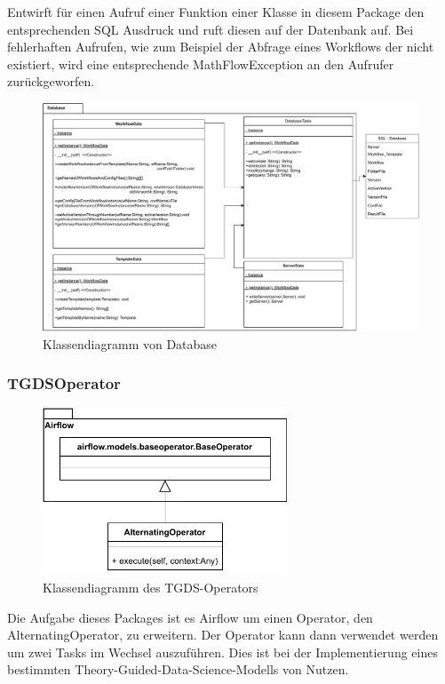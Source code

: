 \subsubsection{}
Entwirft für einen Aufruf einer Funktion einer Klasse in diesem Package den entsprechenden SQL Ausdruck und ruft diesen auf der Datenbank auf.
Bei fehlerhaften Aufrufen, wie zum Beispiel der Abfrage eines Workflows der nicht existiert, wird eine entsprechende MathFlowException an den Aufrufer zurückgeworfen.
\begin{figure}[h!]
	\centering
	\includegraphics[width=1\textwidth]{res/Database_Package.pdf} 
	\caption{Klassendiagramm von Database}
	\label{fig:database_package}
\end{figure}

\FloatBarrier
\newpage

\subsubsection{TGDSOperator}
\begin{figure}[h!]
    \centering
    \includegraphics[width=0.65\textwidth]{res/Klassen/tgdsOp.pdf}
    \caption{Klassendiagramm des TGDS-Operators}
\end{figure}
\FloatBarrier
Die Aufgabe dieses Packages ist es Airflow um einen Operator, den AlternatingOperator, zu erweitern.
Der Operator kann dann verwendet werden um zwei Tasks im Wechsel auszuführen. 
Dies ist bei der Implementierung eines bestimmten Theory-Guided-Data-Science-Modells von Nutzen. 

